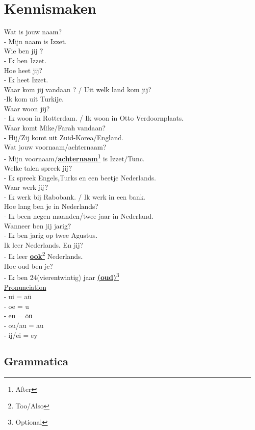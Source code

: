 \documentclass[a4paper,14pt]{extarticle}
\newcommand{\optional}[1]{\underline{\textbf{(#1)}}\footnote{Optional}}
\newcommand{\note}[2]{\underline{\textbf{#1}}\footnote{#2}}
\begin{document}
\section{Kennismaken}
\begin{paracol}{2}
Wat is jouw naam? \\
- Mijn naam is Izzet. \\
Wie ben jij ? \\
- Ik ben Izzet. \\
Hoe heet jij? \\
- Ik heet Izzet. \\
Waar kom jij vandaan ? / Uit welk land kom jij? \\
-Ik kom uit Turkije. \\
Waar woon jij? \\
- Ik woon in Rotterdam. / Ik woon in Otto Verdoornplaats. \\
Waar komt Mike/Farah vandaan? \\
- Hij/Zij komt uit Zuid-Korea/England. \\
Wat jouw voornaam/achternaam? \\
- Mijn voornaam/\note{achternaam}{After} is Izzet/Tunc. \\
Welke talen spreek jij? \\
- Ik spreek Engels,Turks en een beetje Nederlands. \\
Waar werk jij? \\
- Ik werk bij Rabobank. / Ik werk in een bank. \\
Hoe lang ben je in Nederlands? \\
- Ik been negen maanden/twee jaar in Nederland. \\
Wanneer ben jij jarig? \\
- Ik ben jarig op twee Agustus. \\
Ik leer Nederlands. En jij? \\
- Ik leer \note{ook}{Too/Also} Nederlands. \\
Hoe oud ben je? \\
- Ik ben 24(vierentwintig) jaar \optional{oud} \\
\switchcolumn
\underline{Pronunciation} \\
- ui = aü \\
- oe = u \\
- eu = öü \\
- ou/au = au \\
- ij/ei = ey \\
\end{paracol}
\newpage
\subsection{Grammatica}
\end{document}
